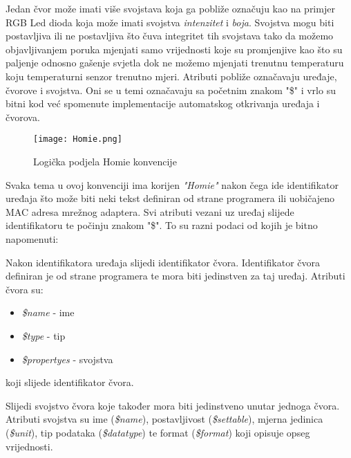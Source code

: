 \documentclass[times, utf8, zavrsni]{fer}
\begin{document}
{Jedan čvor može imati više svojstava koja ga pobliže označuju kao na primjer RGB Led dioda koja može imati svojstva \textit{intenzitet} i \textit{boja}.
Svojstva mogu biti postavljiva ili ne postavljiva što čuva integritet tih svojstava tako da možemo objavljivanjem poruka mjenjati samo vrijednosti koje su promjenjive kao što su paljenje odnosno gašenje svjetla dok ne možemo mjenjati trenutnu temperaturu koju temperaturni senzor trenutno mjeri.
Atributi pobliže označavaju uređaje, čvorove i svojstva.
Oni se u temi označavaju sa početnim znakom "\$" i vrlo su bitni kod već spomenute implementacije automatskog otkrivanja uređaja i čvorova.
\begin{figure}[h]
    \centering
    \texttt{[image: Homie.png]}
    \caption{Logička podjela Homie konvencije}
\end{figure}

Svaka tema u ovoj konvenciji ima korijen \textit{"Homie"} nakon čega ide identifikator uređaja što može biti neki tekst definiran od strane programera ili uobičajeno MAC adresa mrežnog adaptera.
Svi atributi vezani uz uređaj slijede identifikatoru te počinju znakom "\$".
To su razni podaci od kojih je bitno napomenuti:

Nakon identifikatora uređaja slijedi identifikator čvora.
Identifikator čvora definiran je od strane programera te mora biti jedinstven za taj uređaj.
Atributi čvora su:
\begin{itemize}
    \item \textit{\$name} - ime
    \item \textit{\$type} - tip
    \item \textit{\$propertyes} - svojstva 
\end{itemize}
koji slijede identifikator čvora.

Slijedi svojstvo čvora koje također mora biti jedinstveno unutar jednoga čvora.
Atributi svojstva su ime (\textit{\$name}), postavljivost (\textit{\$settable}), mjerna jedinica (\textit{\$unit}), tip podataka (\textit{\$datatype}) te format (\textit{\$format}) koji opisuje opseg vrijednosti.

}
\end{document}
